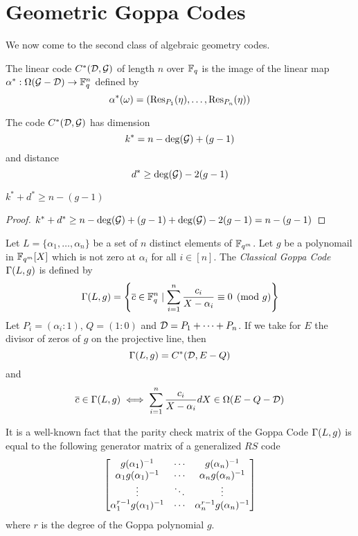 \section{Geometric Goppa Codes}
We now come to the second class of algebraic geometry codes. 
\begin{definition}
	The linear code $C^*(\mathcal{D},\mathcal{G})$ of length $n$ over $\mathbb{F}_q$ is the image of the linear map $\alpha^*:\Omega(\mathcal{G}-\mathcal{D})\to \mathbb{F}_q^n$ defined by $$\alpha^*(\omega)=(\operatorname{Res}_{P_1}(\eta), \dots, \operatorname{Res}_{P_n}(\eta))$$
\end{definition}
\begin{theorem}
	The code $C^*(\mathcal{D},\mathcal{G})$ has dimension $$k^*=n-\deg(\mathcal{G})+(g-1)$$ and distance $$d^*\geq \deg(\mathcal{G})-2(g-1)$$
\end{theorem}
\begin{corollary}
	$k^*+d^*\geq n-(g-1)$
\end{corollary}
\begin{proof}
	$k^*+d^*\geq n-\deg(\mathcal{G})+(g-1)+\deg(\mathcal{G})-2(g-1)=n-(g-1)$
\end{proof}
\begin{example}
	Let $L=\{\alpha_1,\dots,\alpha_n\}$ be a set of $n$ distinct elements of $\mathbb{F}_{q^m}$. Let $g$ be a polynomail in $\mathbb{F}_{q^m}[X]$ which is not zero at $\alpha_i$ for all $i\in [n]$. The \textit{Classical Goppa Code} $\Gamma(L,g)$ is defined by $$\Gamma(L,g)=\left\{\overline{c}\in \mathbb{F}_q^n\mid \sum_{i=1}^n\frac{c_i}{X-\alpha_i}\equiv 0 \pmod{g}\right\}$$Let $P_i=(\alpha_i:1)$, $Q=(1:0)$ and $\mathcal{D}=P_1+\dots+P_n$. If we take for $E$ the divisor of zeros of $g$ on the projective line, then $$\Gamma(L,g)=C^*(\mathcal{D}, E-Q)$$ and $$\overline{c}\in \Gamma(L,g)\iff \sum_{i=1}^n\frac{c_i}{X-\alpha_i}dX\in \Omega(E-Q-\mathcal{D})$$
	
	It is a well-known fact that the parity check matrix of the Goppa Code $\Gamma(L,g)$ is equal to the following generator matrix of a generalized $RS$ code $$\left[\begin{matrix}g(\alpha_1)^{-1}  & \cdots & g(\alpha_n)^{-1}\\ \alpha_1g(\alpha_1)^{-1}  & \cdots & \alpha_ng(\alpha_n)^{-1}\\ \vdots & \ddots & \vdots \\ \alpha_1^{r-1}g(\alpha_1)^{-1}  & \cdots & \alpha_n^{r-1}g(\alpha_n)^{-1}\end{matrix}\right]$$where $r$ is the degree of the Goppa polynomial $g$.
\end{example}
